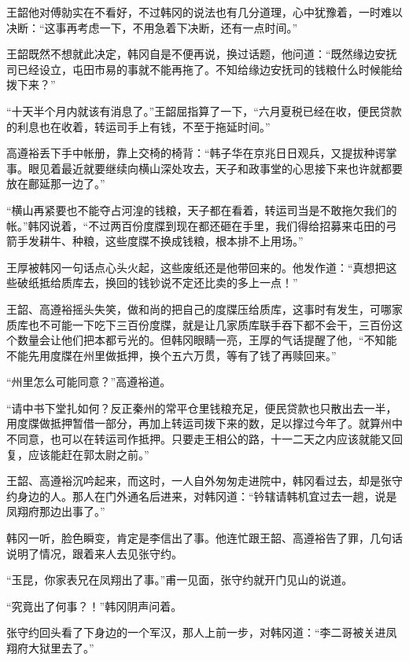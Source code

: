 王韶他对傅勍实在不看好，不过韩冈的说法也有几分道理，心中犹豫着，一时难以决断：“这事再考虑一下，不用急着下决断，还有一点时间。”

王韶既然不想就此决定，韩冈自是不便再说，换过话题，他问道：“既然缘边安抚司已经设立，屯田市易的事就不能再拖了。不知给缘边安抚司的钱粮什么时候能给拨下来？”

“十天半个月内就该有消息了。”王韶屈指算了一下，“六月夏税已经在收，便民贷款的利息也在收着，转运司手上有钱，不至于拖延时间。”

高遵裕丢下手中帐册，靠上交椅的椅背：“韩子华在京兆日日观兵，又提拔种谔掌事。眼见着最近就要继续向横山深处攻去，天子和政事堂的心思接下来也许就都要放在鄜延那一边了。”

“横山再紧要也不能夺占河湟的钱粮，天子都在看着，转运司当是不敢拖欠我们的帐。”韩冈说着，“不过两百份度牒到现在都还砸在手里，我们得给招募来屯田的弓箭手发耕牛、种粮，这些度牒不换成钱粮，根本排不上用场。”

王厚被韩冈一句话点心头火起，这些废纸还是他带回来的。他发作道：“真想把这些破纸抵给质库去，换回的钱钞说不定还比卖的多上一点！”

王韶、高遵裕摇头失笑，做和尚的把自己的度牒压给质库，这事时有发生，可哪家质库也不可能一下吃下三百份度牒，就是让几家质库联手吞下都不会干，三百份这个数量会让他们把本都亏光的。但韩冈眼睛一亮，王厚的气话提醒了他，“不知能不能先用度牒在州里做抵押，换个五六万贯，等有了钱了再赎回来。”

“州里怎么可能同意？”高遵裕道。

“请中书下堂扎如何？反正秦州的常平仓里钱粮充足，便民贷款也只散出去一半，用度牒做抵押暂借一部分，再加上转运司拨下来的数，足以撑过今年了。就算州中不同意，也可以在转运司作抵押。只要走王相公的路，十一二天之内应该就能又回复，应该能赶在郭太尉之前。”

王韶、高遵裕沉吟起来，而这时，一人自外匆匆走进院中，韩冈看过去，却是张守约身边的人。那人在门外通名后进来，对韩冈道：“钤辖请韩机宜过去一趟，说是凤翔府那边出事了。”

韩冈一听，脸色瞬变，肯定是李信出了事。他连忙跟王韶、高遵裕告了罪，几句话说明了情况，跟着来人去见张守约。

“玉昆，你家表兄在凤翔出了事。”甫一见面，张守约就开门见山的说道。

“究竟出了何事？！”韩冈阴声问着。

张守约回头看了下身边的一个军汉，那人上前一步，对韩冈道：“李二哥被关进凤翔府大狱里去了。”

